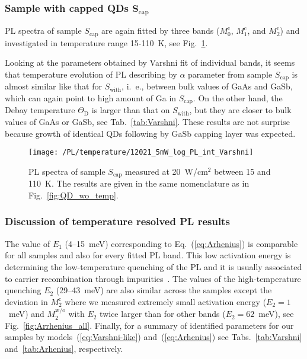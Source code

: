 \subsubsection*{Sample with capped QDs $\mathbf{S_\mathrm{cap}}$}
%
PL spectra of sample ${S_\mathrm{cap}}$ are again fitted by three bands ($M_0^\mathrm{c}$, $M_1^\mathrm{c}$, and $M_2^\mathrm{c}$) and investigated in temperature range 15-110~K, see Fig.~\ref{fig:QD_c_temp}.

Looking at the parameters obtained by Varshni fit of individual bands, it seems that temperature evolution of PL describing by $\alpha$ parameter from sample ${S_\mathrm{cap}}$ is almost similar like that for ${S_\mathrm{with}}$, i.~e., between bulk values of GaAs and GaSb, which can again point to high amount of Ga in ${S_\mathrm{cap}}$. On the other hand, the Debay temperature $\Theta_\mathrm{D}$ is larger than that on ${S_\mathrm{with}}$, but they are closer to bulk values of GaAs or GaSb, see Tab.~\ref{tab:Varshni}. These results are not surprise because growth of identical QDs following by GaSb capping layer was expected.
%
\begin{figure}[h]
	\centering
	\texttt{[image: /PL/temperature/12021\_5mW\_log\_PL\_int\_Varshni]}
	\caption{PL spectra of sample ${S_\mathrm{cap}}$ measured at 20~W/cm$^2$ between 15 and 110~K. The results are given in the same nomenclature as in Fig.~\ref{fig:QD_wo_temp}.}
	\label{fig:QD_c_temp}
\end{figure}

\newpage
\subsubsection*{Discussion of temperature resolved PL results}
%
The value of $E_1$ (4--15~meV) corresponding to Eq.~(\ref{eq:Arhenius}) is comparable for all samples and also for every fitted PL band. This low activation energy is determining the low-temperature quenching of the PL and it is usually associated to carrier recombination through impurities~\cite{YuCardona}. The values of the high-temperature quenching $E_2$ (29--43~meV) are also similar across the samples except the deviation in $M_2^\mathrm{c}$ where we measured extremely small activation energy ($E_2=1$~meV) and $M_2^\mathrm{w/o}$ with $E_2$ twice larger than for other bands ($E_2=62$~meV), see Fig.~\ref{fig:Arrhenius_all}. Finally, for a summary of identified parameters for our samples by models~(\ref{eq:Varshni-like}) and~(\ref{eq:Arhenius}) see Tabs.~\ref{tab:Varshni} and~\ref{tab:Arhenius}, respectively.

